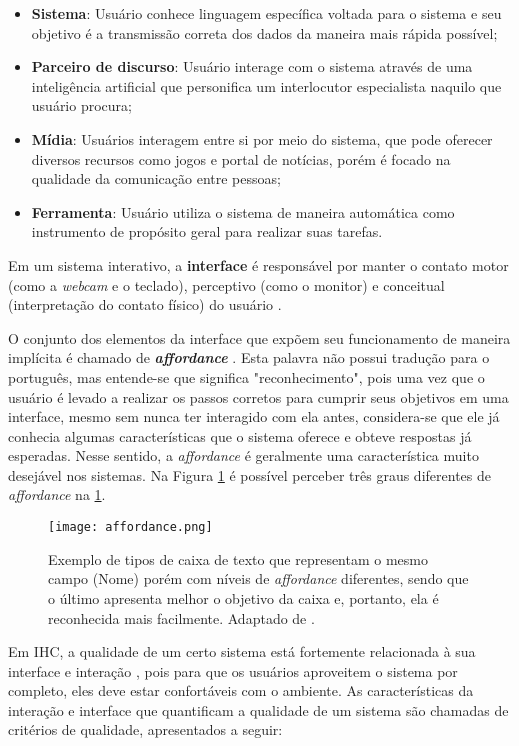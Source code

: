 \begin{itemize}
\item[1] \textbf{Sistema}: Usuário conhece linguagem específica voltada para o sistema e seu objetivo é a transmissão correta dos dados da maneira mais rápida possível;
\item[2] \textbf{Parceiro de discurso}: Usuário interage com o sistema através de uma inteligência artificial que personifica um interlocutor especialista naquilo que usuário procura;
\item[3] \textbf{Mídia}: Usuários interagem entre si por meio do sistema, que pode oferecer diversos recursos como jogos e portal de notícias, porém é focado na qualidade da comunicação entre pessoas;
\item[4] \textbf{Ferramenta}: Usuário utiliza o sistema de maneira automática como instrumento de propósito geral para realizar suas tarefas. 
\end{itemize}

\indent Em um sistema interativo, a \textbf{interface} é responsável por manter o contato motor (como a \textit{webcam} e o teclado), perceptivo (como o monitor) e conceitual (interpretação do contato físico) do usuário \cite{IHCbook}. 

\indent O conjunto dos elementos da interface que expõem seu funcionamento de maneira implícita é chamado de \textbf{\textit{affordance}} \cite{IHCbook}. Esta palavra não possui tradução para o português, mas entende-se que significa "reconhecimento", pois uma vez que o usuário é levado a realizar os passos corretos para cumprir seus objetivos em uma interface, mesmo sem nunca ter interagido com ela antes, considera-se que ele já conhecia algumas características que o sistema oferece e obteve respostas já esperadas. Nesse sentido, a \textit{affordance} é geralmente uma característica muito desejável nos sistemas. Na Figura \ref{fig:Affordance} é possível perceber três graus diferentes de \textit{affordance} na \ref{fig:Affordance}.

\begin{figure}[!h]
    \centering
    \texttt{[image: affordance.png]}
    \caption{Exemplo de tipos de caixa de texto que representam o mesmo campo (Nome) porém com níveis de \textit{affordance} diferentes, sendo que o último apresenta melhor o objetivo da caixa e, portanto, ela é reconhecida mais facilmente. Adaptado de \cite{affordance}.}
    \label{fig:Affordance}
\end{figure} 

\indent Em IHC, a qualidade de um certo sistema está fortemente relacionada à sua interface e interação \cite{IHCbook}, pois para que os usuários aproveitem o sistema por completo, eles deve estar confortáveis com o ambiente. As características da interação e interface que quantificam a qualidade de um sistema são chamadas de critérios de qualidade, apresentados a seguir:

